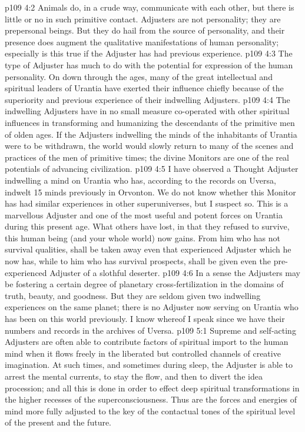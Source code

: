 \vs p109 4:2 Animals do, in a crude way, communicate with each other, but there is little or no  in such primitive contact. Adjusters are not personality; they are prepersonal beings. But they do hail from the source of personality, and their presence does augment the qualitative manifestations of human personality; especially is this true if the Adjuster has had previous experience.
\vs p109 4:3 The type of Adjuster has much to do with the potential for expression of the human personality. On down through the ages, many of the great intellectual and spiritual leaders of Urantia have exerted their influence chiefly because of the superiority and previous experience of their indwelling Adjusters.
\vs p109 4:4 The indwelling Adjusters have in no small measure co\hyp{}operated with other spiritual influences in transforming and humanizing the descendants of the primitive men of olden ages. If the Adjusters indwelling the minds of the inhabitants of Urantia were to be withdrawn, the world would slowly return to many of the scenes and practices of the men of primitive times; the divine Monitors are one of the real potentials of advancing civilization.
\vs p109 4:5 \pc I have observed a Thought Adjuster indwelling a mind on Urantia who has, according to the records on Uversa, indwelt 15 minds previously in Orvonton. We do not know whether this Monitor has had similar experiences in other superuniverses, but I suspect so. This is a marvellous Adjuster and one of the most useful and potent forces on Urantia during this present age. What others have lost, in that they refused to survive, this human being (and your whole world) now gains. From him who has not survival qualities, shall be taken away even that experienced Adjuster which he now has, while to him who has survival prospects, shall be given even the pre\hyp{}experienced Adjuster of a slothful deserter.
\vs p109 4:6 In a sense the Adjusters may be fostering a certain degree of planetary cross\hyp{}fertilization in the domains of truth, beauty, and goodness. But they are seldom given two indwelling experiences on the same planet; there is no Adjuster now serving on Urantia who has been on this world previously. I know whereof I speak since we have their numbers and records in the archives of Uversa.
\vs p109 5:1 Supreme and self\hyp{}acting Adjusters are often able to contribute factors of spiritual import to the human mind when it flows freely in the liberated but controlled channels of creative imagination. At such times, and sometimes during sleep, the Adjuster is able to arrest the mental currents, to stay the flow, and then to divert the idea procession; and all this is done in order to effect deep spiritual transformations in the higher recesses of the superconsciousness. Thus are the forces and energies of mind more fully adjusted to the key of the contactual tones of the spiritual level of the present and the future.
